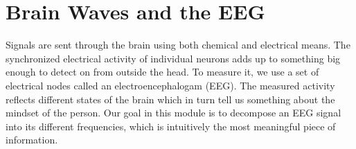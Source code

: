 \documentclass{article}
\begin{document}


%
%
%

\section*{Brain Waves and the EEG}
Signals are sent through the brain using both chemical and electrical means.  The synchronized electrical activity of individual neurons adds up to something big enough to detect on from outside the head.  To measure it, we use a set of electrical nodes called an electroencephalogam (EEG).  The measured activity reflects different states of the brain which in turn tell us something about the mindset of the person.  Our goal in this module is to decompose an EEG signal into its different frequencies, which is intuitively the most meaningful piece of information.
\end{document}
